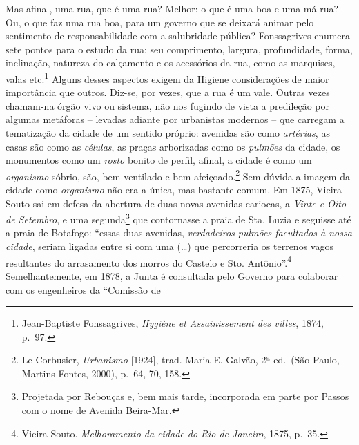 Mas afinal, uma rua, que é uma rua? Melhor: o que é uma boa e uma má
rua? Ou, o que faz uma rua boa, para um governo que se deixará animar
pelo sentimento de responsabilidade com a salubridade pública?
Fonssagrives enumera sete pontos para o estudo da rua: seu comprimento,
largura, profundidade, forma, inclinação, natureza do calçamento e os
acessórios da rua, como as marquises, valas etc.\footnote{Jean-Baptiste
  Fonssagrives, \emph{Hygiène et Assainissement des villes}, 1874,
  p.~97.} Alguns desses aspectos exigem da Higiene considerações de
maior importância que outros. Diz-se, por vezes, que a rua é um vale.
Outras vezes chamam-na órgão vivo ou sistema, não nos fugindo de vista a
predileção por algumas metáforas -- levadas adiante por urbanistas
modernos -- que carregam a tematização da cidade de um sentido próprio:
avenidas são como \emph{artérias}, as casas são como as \emph{células},
as praças arborizadas como os \emph{pulmões} da cidade, os monumentos
como um \emph{rosto} bonito de perfil, afinal, a cidade é como um
\emph{organismo} sóbrio, são, bem ventilado e bem afeiçoado.\footnote{Le
  Corbusier, \emph{Urbanismo} {[}1924{]}, trad. Maria E. Galvão, 2ª
  ed.~(São Paulo, Martins Fontes, 2000), p.~64, 70, 158.} Sem dúvida a
imagem da cidade como \emph{organismo} não era a única, mas bastante
comum. Em 1875, Vieira Souto sai em defesa da abertura de duas novas
avenidas cariocas, a \emph{Vinte e Oito de Setembro}, e uma
segunda\footnote{Projetada por Rebouças e, bem mais tarde, incorporada
  em parte por Passos com o nome de Avenida Beira-Mar.} que contornasse
a praia de Sta. Luzia e seguisse até a praia de Botafogo: ``essas duas
avenidas, \emph{verdadeiros pulmões facultados à nossa cidade}, seriam
ligadas entre si com uma (\ldots{}) que percorreria os terrenos vagos
resultantes do arrasamento dos morros do Castelo e Sto.
Antônio''.\footnote{Vieira Souto. \emph{Melhoramento da cidade do Rio de
  Janeiro}, 1875, p.~35.} Semelhantemente, em 1878, a Junta é consultada
pelo Governo para colaborar com os engenheiros da ``Comissão de
